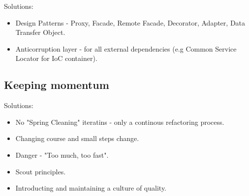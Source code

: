 \documentclass[11pt,a4paper]{article}
\begin{document}
Solutions:
\begin{itemize}
	\item Design Patterns - Proxy, Facade, Remote Facade, Decorator, Adapter, Data Transfer Object.
	\item Anticorruption layer - for all external dependencies (e.g Common Service Locator for IoC container).
\end{itemize}

\subsection{Keeping momentum}

Solutions:
\begin{itemize}
	\item No "Spring Cleaning" iteratins - only a continous refactoring process.
	\item Changing course and small steps change.
	\item Danger - "Too much, too fast".
	\item Scout principles.
	\item Introducting and maintaining a culture of quality.
\end{itemize}
\end{document}
